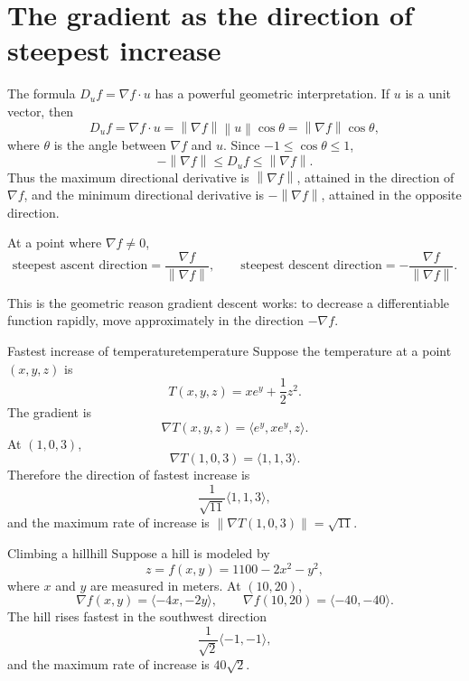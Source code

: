 \documentclass[11pt]{article}
\newcommand{\grad}{\nabla}
\newcommand{\norm}[1]{\left\lVert #1\right\rVert}
\begin{document}
\section{The gradient as the direction of steepest increase}

The formula $D_u f=\grad f\cdot u$ has a powerful geometric interpretation. If $u$ is a unit vector, then
\[
D_u f=\grad f\cdot u=\norm{\grad f}\norm{u}\cos\theta=\norm{\grad f}\cos\theta,
\]
where $\theta$ is the angle between $\grad f$ and $u$. Since $-1\le \cos\theta\le 1$,
\[
-\norm{\grad f}\le D_u f\le \norm{\grad f}.
\]
Thus the maximum directional derivative is $\norm{\grad f}$, attained in the direction of $\grad f$, and the minimum directional derivative is $-\norm{\grad f}$, attained in the opposite direction.

\begin{importantbox}
At a point where $\grad f\ne 0$,
\[
\text{steepest ascent direction}=\frac{\grad f}{\norm{\grad f}},
\qquad
\text{steepest descent direction}=-\frac{\grad f}{\norm{\grad f}}.
\]
\end{importantbox}

This is the geometric reason gradient descent works: to decrease a differentiable function rapidly, move approximately in the direction $-\grad f$.

\begin{workedexample}{Fastest increase of temperature}{temperature}
Suppose the temperature at a point $(x,y,z)$ is
\[
T(x,y,z)=xe^y+\frac12 z^2.
\]
The gradient is
\[
\grad T(x,y,z)=\langle e^y,xe^y,z\rangle.
\]
At $(1,0,3)$,
\[
\grad T(1,0,3)=\langle 1,1,3\rangle.
\]
Therefore the direction of fastest increase is
\[
\frac{1}{\sqrt{11}}\langle 1,1,3\rangle,
\]
and the maximum rate of increase is $\norm{\grad T(1,0,3)}=\sqrt{11}$.
\end{workedexample}

\begin{workedexample}{Climbing a hill}{hill}
Suppose a hill is modeled by
\[
z=f(x,y)=1100-2x^2-y^2,
\]
where $x$ and $y$ are measured in meters. At $(10,20)$,
\[
\grad f(x,y)=\langle -4x,-2y\rangle,
\qquad
\grad f(10,20)=\langle -40,-40\rangle.
\]
The hill rises fastest in the southwest direction
\[
\frac{1}{\sqrt2}\langle -1,-1\rangle,
\]
and the maximum rate of increase is $40\sqrt2$.
\end{workedexample}
\end{document}

